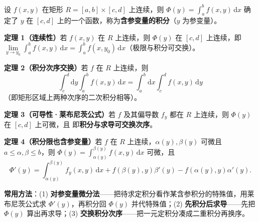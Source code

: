 设 $f(x,y)$ 在矩形 $R=[a,b]\times[c,d]$ 上连续，则 $\Phi(y)=\int_a^bf(x,y)\,\mathrm{d}x$ 确定了 $y$ 在 $[c,d]$ 上的一个函数，称为\textbf{含参变量的积分}（$y$ 为参变量）。

\textbf{定理 1（连续性）}\quad 若 $f(x,y)$ 在 $R$ 上连续，则 $\Phi(y)$ 在 $[c,d]$ 上连续，即 $\lim\limits_{y\to y_0}\int_a^bf(x,y)\,\mathrm{d}x=\int_a^bf(x,y_0)\,\mathrm{d}x$（极限与积分可交换）。

\textbf{定理 2（积分次序交换）}\quad 若 $f$ 在 $R$ 上连续，则
\[
\int_c^d\mathrm{d}y\int_a^bf(x,y)\,\mathrm{d}x=\int_a^b\mathrm{d}x\int_c^df(x,y)\,\mathrm{d}y
\]
（即矩形区域上两种次序的二次积分相等）。

\textbf{定理 3（可导性·莱布尼茨公式）}\quad 若 $f$ 及其偏导数 $f_y$ 都在 $R$ 上连续，则 $\Phi(y)$ 在 $[c,d]$ 上可微，且
即\textbf{积分与求导可交换次序}。

\textbf{定理 4（积分限也含参变量）}\quad 若 $f$ 在 $R$ 上连续，$\alpha(y),\beta(y)$ 可微且 $a\le\alpha,\beta\le b$，则 $\Phi(y)=\int_{\alpha(y)}^{\beta(y)}f(x,y)\,\mathrm{d}x$ 可微，且
\[
\Phi'(y)=\int_{\alpha(y)}^{\beta(y)}f_y(x,y)\,\mathrm{d}x+f(\beta(y),y)\beta'(y)-f(\alpha(y),y)\alpha'(y).
\]

\textbf{常用方法}：(1) \textbf{对参变量微分法}——把待求定积分看作某含参积分的特殊值，用莱布尼茨公式求 $\Phi'(y)$，再积分回 $\Phi(y)$ 并代特殊值；(2) \textbf{先积分后求导}——先把 $\Phi(y)$ 算出再求导；(3) \textbf{交换积分次序}——把一元定积分凑成二重积分再换序。

